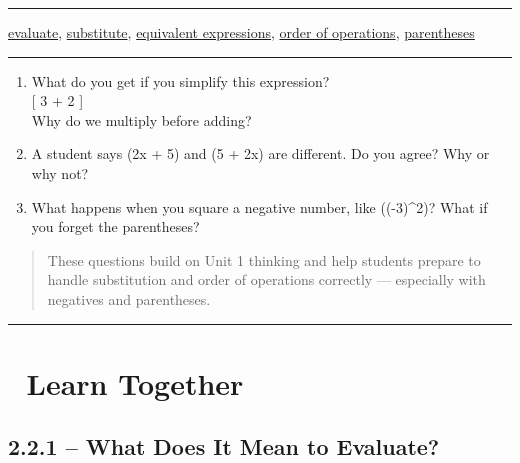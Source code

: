 \documentclass[
  letterpaper,
  DIV=11,
  numbers=noendperiod]{scrreprt}
\begin{document}
\begin{center}\rule{0.5\linewidth}{0.5pt}\end{center}

\href{./glossary.html\#glossary-evaluate}{evaluate},
\href{./glossary.html\#glossary-substitute}{substitute},
\href{./glossary.html\#glossary-equivalent-expression}{equivalent expressions},
\href{./glossary.html\#glossary-order-of-operations}{order of operations},
\href{./glossary.html\#glossary-parentheses}{parentheses}

\begin{center}\rule{0.5\linewidth}{0.5pt}\end{center}

\begin{enumerate}
\def\labelenumi{\arabic{enumi}.}
\item
  What do you get if you simplify this expression?\\
  {[} 3 + 2  {]}\\
  Why do we multiply before adding?
\item
  A student says (2x + 5) and (5 + 2x) are different. Do you agree? Why
  or why not?
\item
  What happens when you square a negative number, like ((-3)\^{}2)? What
  if you forget the parentheses?
\end{enumerate}

\begin{quote}
These questions build on Unit 1 thinking and help students prepare to
handle substitution and order of operations correctly --- especially
with negatives and parentheses.
\end{quote}

\begin{center}\rule{0.5\linewidth}{0.5pt}\end{center}

\section*{🧠 Learn Together}\label{learn-together-8}


\subsection*{2.2.1 -- What Does It Mean to
Evaluate?}\label{what-does-it-mean-to-evaluate}
\end{document}
